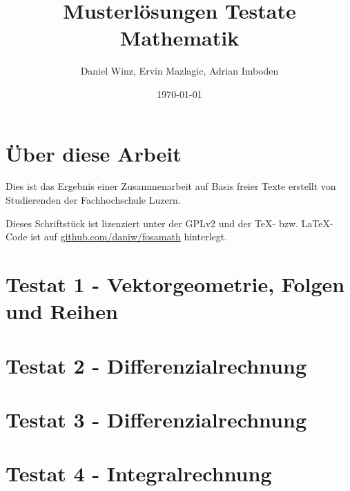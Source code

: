 \documentclass[a4paper,10pt,fleqn]{book}
\title{Musterlösungen Testate Mathematik}
\author{Daniel Winz, Ervin Mazlagic, Adrian Imboden}
\date{\today}
\begin{document}
\maketitle

\chapter*{Über diese Arbeit}
Dies ist das Ergebnis einer Zusammenarbeit auf Basis freier Texte erstellt von Studierenden der Fachhochschule Luzern. 

Dieses Schriftstück ist lizenziert unter der GPLv2 und der \TeX-  bzw. \LaTeX- Code ist auf \url{github.com/daniw/fosamath} hinterlegt.


\tableofcontents
\chapter{Testat 1 - Vektorgeometrie, Folgen und Reihen}

\chapter{Testat 2 - Differenzialrechnung}

\chapter{Testat 3 - Differenzialrechnung}

\chapter{Testat 4 - Integralrechnung}

\end{document}
